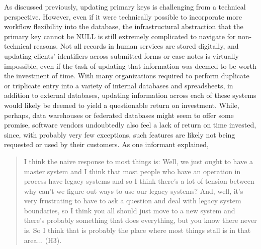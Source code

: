 As discussed previously, updating primary keys is challenging from a technical perspective. However, even if it were technically possible to incorporate more workflow flexibility into the database, the infrastructural abstraction that the primary key cannot be NULL is still extremely complicated to navigate for non-technical reasons. Not all records in human services are stored digitally, and updating clients' identifiers across submitted forms or case notes is virtually impossible, even if the task of updating that information was deemed to be worth the investment of time. With many organizations required to perform duplicate or triplicate entry into a variety of internal databases and spreadsheets, in addition to external databases, updating information across each of these systems would likely be deemed to yield a questionable return on investment. While, perhaps, data warehouses or federated databases might seem to offer some promise, software vendors undoubtedly also feel a lack of return on time invested, since, with probably very few exceptions, such features are likely not being requested or used by their customers. As one informant explained,

\begin{quote}\singlespacing
I think the naive response to most things is: Well, we just ought to have a master system and I think that most people who have an operation in process have legacy systems and so I think there's a lot of tension between why can't we figure out ways to use our legacy systems? And, well, it's very frustrating to have to ask a question and deal with legacy system boundaries, so I think you all should just move to a new system and there's probably something that does everything, but you know there never is. So I think that is probably the place where most things stall is in that area... (H3).
\end{quote}

